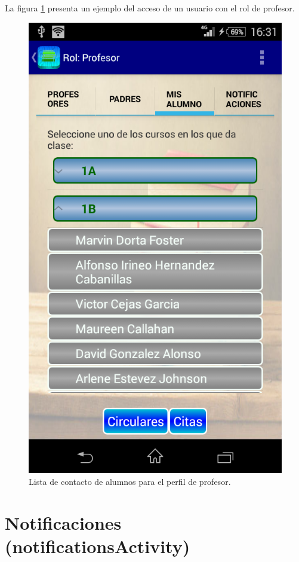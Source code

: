 		\bigskip
		La figura \ref{fig:profeAlu} presenta un ejemplo del acceso de un usuario con el rol de profesor.
		
		\begin{figure}[h !]
			\centering
			\includegraphics[scale=0.3]{Imagenes/App/profeAlu}
			\caption{Lista de contacto de alumnos para el perfil de profesor.}
			\label{fig:profeAlu}
		\end{figure}
	
	\section{Notificaciones ({\ttfamily notificationsActivity})} \label{sec:notifications}
	
